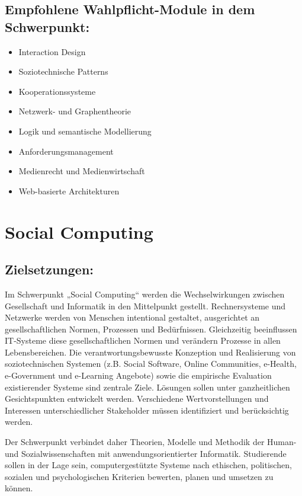 \section*{Empfohlene Wahlpflicht-Module in dem
Schwerpunkt:}\label{empfohlene-wahlpflicht-module-in-dem-schwerpunkt-1}

\begin{itemize}
\item
  Interaction Design
\item
  Soziotechnische Patterns
\item
  Kooperationssysteme
\item
  Netzwerk- und Graphentheorie
\item
  Logik und semantische Modellierung
\item
  Anforderungsmanagement
\item
  Medienrecht und Medienwirtschaft
\item
  Web-basierte Architekturen
\end{itemize}

\chapter{Social Computing}\label{social-computing}

\section*{Zielsetzungen:}\label{zielsetzungen-1}

Im Schwerpunkt „Social Computing`` werden die Wechselwirkungen zwischen
Gesellschaft und Informatik in den Mittelpunkt gestellt. Rechnersysteme
und Netzwerke werden von Menschen intentional gestaltet, ausgerichtet an
gesellschaftlichen Normen, Prozessen und Bedürfnissen. Gleichzeitig
beeinflussen IT-Systeme diese gesellschaftlichen Normen und verändern
Prozesse in allen Lebensbereichen. Die verantwortungsbewusste Konzeption
und Realisierung von soziotechnischen Systemen (z.B. Social Software,
Online Communities, e-Health, e-Government und e-Learning Angebote)
sowie die empirische Evaluation existierender Systeme sind zentrale
Ziele. Lösungen sollen unter ganzheitlichen Gesichtspunkten entwickelt
werden. Verschiedene Wertvorstellungen und Interessen unterschiedlicher
Stakeholder müssen identifiziert und berücksichtig werden.

Der Schwerpunkt verbindet daher Theorien, Modelle und Methodik der
Human- und Sozialwissenschaften mit anwendungsorientierter Informatik.
Studierende sollen in der Lage sein, computergestützte Systeme nach
ethischen, politischen, sozialen und psychologischen Kriterien bewerten,
planen und umsetzen zu können.

